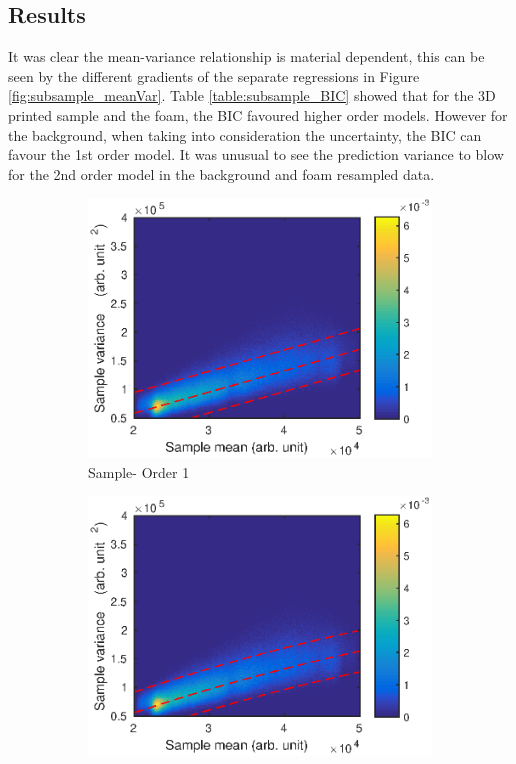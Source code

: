 \documentclass[12pt]{report}
\begin{document}
\subsection{Results}

It was clear the mean-variance relationship is material dependent, this can be seen by the different gradients of the separate regressions in Figure \ref{fig:subsample_meanVar}. Table \ref{table:subsample_BIC} showed that for the 3D printed sample and the foam, the BIC favoured higher order models. However for the background, when taking into consideration the uncertainty, the BIC can favour the 1st order model. It was unusual to see the prediction variance to blow for the 2nd order model in the background and foam resampled data.

\begin{figure}
	\centering
	\begin{subfigure}{0.45\textwidth}
		\includegraphics[width=\textwidth]{figures/meanVar/subsample_sample1.eps}
		\caption{Sample- Order 1}
	\end{subfigure}
	\begin{subfigure}{0.45\textwidth}
		\includegraphics[width=\textwidth]{figures/meanVar/subsample_sample2.eps}

\end{subfigure}
\end{figure}
\end{document}
